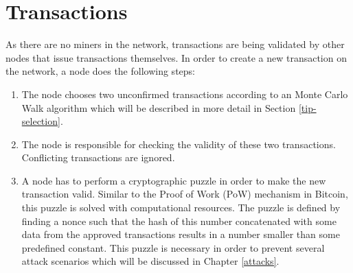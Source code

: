 \section{Transactions}\label{transactions}

As there are no miners in the network, transactions are being validated by other nodes that issue transactions themselves. In order to create a new transaction on the network, a node does the following steps:
\begin{enumerate}
    \item The node chooses two unconfirmed transactions according to an Monte Carlo Walk algorithm which will be described in more detail in Section \ref{tip-selection}.
    \item The node is responsible for checking the validity of these two transactions. Conflicting transactions are ignored.
    \item A node has to perform a cryptographic puzzle in order to make the new transaction valid. Similar to the Proof of Work (PoW) mechanism in Bitcoin, this puzzle is solved with computational resources. The puzzle is defined by finding a nonce such that the hash of this number concatenated with some data from the approved transactions results in a number smaller than some predefined constant. This puzzle is necessary in order to prevent several attack scenarios which will be discussed in Chapter \ref{attacks}.
\end{enumerate}

